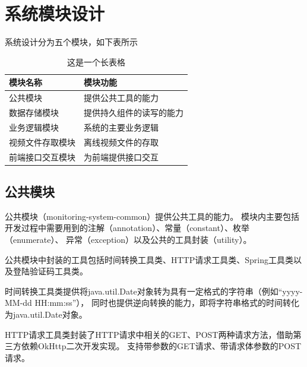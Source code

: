 \section{系统模块设计}
系统设计分为五个模块，如下表所示


\begin{longtable}[c]{C{5cm}C{7cm}}
    \caption{这是一个长表格}\label{Tab:longtable}\\
    \hline
    模块名称 & 模块功能\\

    \hline
    公共模块&提供公共工具的能力\\ %
    \hline
    数据存储模块&提供持久组件的读写的能力\\ %
    \hline
    业务逻辑模块&系统的主要业务逻辑\\ %
    \hline
    视频文件存取模块&离线视频文件的存取\\ %
    \hline
    前端接口交互模块&为前端提供接口交互\\ %
    \hline
\end{longtable}
\subsection{公共模块}
公共模块（monitoring-system-common）提供公共工具的能力。
模块内主要包括开发过程中需要用到的注解（annotation）、常量（constant）、枚举（enumerate）、
异常（exception）以及公共的工具封装（utility）。

公共模块中封装的工具包括时间转换工具类、HTTP请求工具类、Spring工具类以及登陆验证码工具类。

时间转换工具类提供将java.util.Date对象转为具有一定格式的字符串（例如“yyyy-MM-dd HH:mm:ss”），
同时也提供逆向转换的能力，即将字符串格式的时间转化为java.util.Date对象。

HTTP请求工具类封装了HTTP请求中相关的GET、POST两种请求方法，借助第三方依赖OkHttp二次开发实现。
支持带参数的GET请求、带请求体参数的POST请求。

